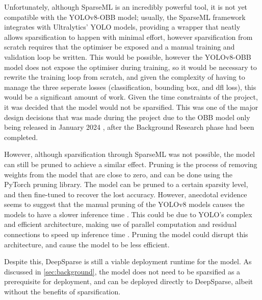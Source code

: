 Unfortunately, although SparseML is an incredibly powerful tool, it is not yet compatible with the YOLOv8-OBB model; usually, the SparseML framework integrates with Ultralytics' YOLO models, providing a wrapper that neatly allows sparsification to happen with minimal effort, however sparsification from scratch requires that the optimiser be exposed and a manual training and validation loop be written. This would be possible, however the YOLOv8-OBB model does not expose the optimiser during training, so it would be necessary to rewrite the training loop from scratch, and given the complexity of having to manage the three seperate losses (classification, bounding box, and dfl loss), this would be a significant amount of work. Given the time constraints of the project, it was decided that the model would not be sparsified. This was one of the major design decisions that was made during the project due to the OBB model only being released in January 2024 \cite{obbrelease}, after the Background Research phase had been completed. 

However, although sparsification through SparseML was not possible, the model can still be pruned to achieve a similar effect. Pruning is the process of removing weights from the model that are close to zero, and can be done using the PyTorch pruning library. The model can be pruned to a certain sparsity level, and then fine-tuned to recover the lost accuracy. However, anecdotal evidence seems to suggest that the manual pruning of the YOLOv8 models causes the models to have a slower inference time \cite{pruning}. This could be due to YOLO's complex and efficient architecture, making use of parallel computation and residual connections to speed up inference time \cite{yolo}. Pruning the model could disrupt this architecture, and cause the model to be less efficient.

Despite this, DeepSparse \cite{deepsparse} is still a viable deployment runtime for the model. As discussed in \autoref{sec:background}, the model does not need to be sparsified as a prerequisite for deployment, and can be deployed directly to DeepSparse, albeit without the benefits of sparsification.

